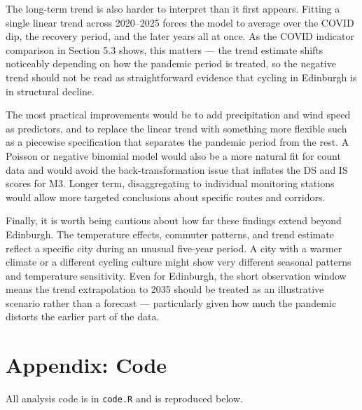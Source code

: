 \documentclass[
]{article}
\begin{document}
The long-term trend is also harder to interpret than it first appears. Fitting
a single linear trend across 2020--2025 forces the model to average over the
COVID dip, the recovery period, and the later years all at once. As the COVID
indicator comparison in Section 5.3 shows, this matters --- the trend estimate
shifts noticeably depending on how the pandemic period is treated, so the
negative trend should not be read as straightforward evidence that cycling in
Edinburgh is in structural decline.

The most practical improvements would be to add precipitation and wind speed
as predictors, and to replace the linear trend with something more flexible
such as a piecewise specification that separates the pandemic period from the
rest. A Poisson or negative binomial model would also be a more natural fit
for count data and would avoid the back-transformation issue that inflates the
DS and IS scores for M3. Longer term, disaggregating to individual monitoring
stations would allow more targeted conclusions about specific routes and
corridors.

Finally, it is worth being cautious about how far these findings extend beyond
Edinburgh. The temperature effects, commuter patterns, and trend estimate
reflect a specific city during an unusual five-year period. A city with a
warmer climate or a different cycling culture might show very different
seasonal patterns and temperature sensitivity. Even for Edinburgh, the short
observation window means the trend extrapolation to 2035 should be treated as
an illustrative scenario rather than a forecast --- particularly given how much
the pandemic distorts the earlier part of the data.

\section{Appendix: Code}\label{appendix-code}

All analysis code is in \texttt{code.R} and is reproduced below.
\end{document}
